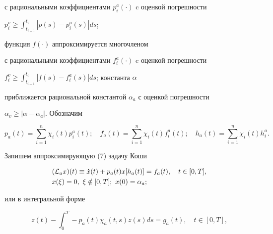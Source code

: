 с рациональными коэффициентами $p_i^a(\cdot)$ c оценкой погрешности


$p_i^v \ge \int_{t_{i-1}}^{t_i} |p(s)-p_i^a(s)| ds$;


функция $f(\cdot)$ аппроксимируется многочленом


с рациональными коэффициентами $f_i^a(\cdot)$ c оценкой погрешности


$f_i^v\ge \int_{t_{i-1}}^{t_i} |f(s)-f_i^a(s)| ds$; константа $\alpha$


приближается рациональной константой $\alpha_a$ с оценкой погрешности


$\alpha_v \ge |\alpha - \alpha_a|$. Обозначим


%


$$


p_a(t) = \sum_{i=1}^{n} \chi_i(t) p_i^a(t); \quad


f_a(t) = \sum_{i=1}^{n} \chi_i(t) f_i^a(t); \quad


h_a(t) = \sum_{i=1}^{n} \chi_i(t) h_i^a. \quad


$$


%





Запишем аппроксимирующую (7) задачу Коши


%


\begin{align}


\begin{split}


& ({\cal L}_a x)(t) \equiv \Dot x(t) + p_a(t)x[h_a(t)] = f_a(t),


\quad t \in [0,T], \\


& x(\xi ) = 0, \ \xi \notin [0,T]; \ x(0)=\alpha_a;


\end{split}


\end{align}


%


или в интегральной форме


%


\begin{equation}


z(t) - \int_0^T -p_a(t) \chi_a (t,s) z(s) ds = g_a(t),


\quad t \in [0,T],


\end{equation}


%


